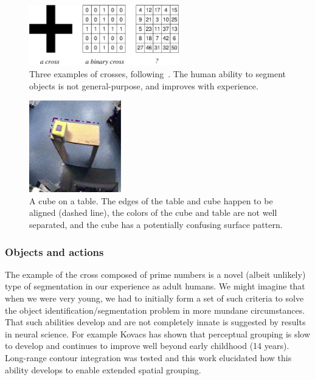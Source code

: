 %
\begin{figure}[tb]
\begin{center}
\includegraphics[width=6.5cm]{number-cross.eps}
\caption{ 
\label{fig:number-cross}
%
Three examples of crosses, following~\cite{manzotti01coscienza}.  The
human ability to segment objects is not general-purpose, and improves
with experience.
%
}
\end{center}
\end{figure}
%
%
\begin{figure}[tb]
\begin{center}
\includegraphics[width=4cm]{setup-sequence.eps}
\caption{ 
\label{fig:setup-sequence}
%
A cube on a table. The edges of the table and cube happen to be
aligned (dashed line), the colors of the cube and table are not well
separated, and the cube has a potentially confusing surface pattern.
%
}
\end{center}
\end{figure}

\subsubsection*{Objects and actions}

The example of the cross composed of prime numbers is a novel (albeit
unlikely) type of segmentation in our experience as adult humans.  We
might imagine that when we were very young, we had to initially form a
set of such criteria to solve the object identification/segmentation
problem in more mundane circumstances.  That such abilities develop
and are not completely innate is suggested by results in neural
science. For example Kovacs \cite{kovacs00human} has shown that
perceptual grouping is slow to develop and continues
to improve well beyond early
childhood (14 years). Long-range contour integration was tested and
this work elucidated how this ability develops to enable extended
spatial grouping.  

